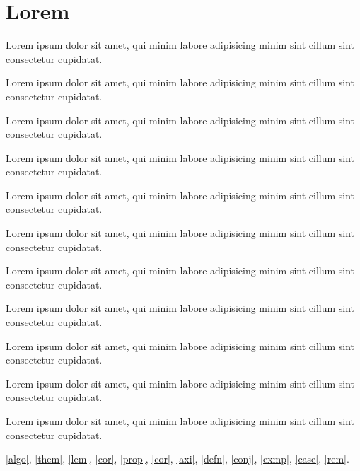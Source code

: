 \documentclass[type=master]{bithesis}
\begin{document}
\chapter{Lorem}

\begin{algo}[Lorem]
  \label{algo}
  Lorem ipsum dolor sit amet, qui minim labore adipisicing minim sint cillum sint consectetur cupidatat.
\end{algo}

\begin{them}[Lorem]
  \label{them}
  Lorem ipsum dolor sit amet, qui minim labore adipisicing minim sint cillum sint consectetur cupidatat.
\end{them}

\begin{lem}[Lorem]
  \label{lem}
  Lorem ipsum dolor sit amet, qui minim labore adipisicing minim sint cillum sint consectetur cupidatat.
\end{lem}

\begin{prop}[Lorem]
  \label{prop}
  Lorem ipsum dolor sit amet, qui minim labore adipisicing minim sint cillum sint consectetur cupidatat.
\end{prop}
\begin{cor}[Lorem]
  \label{cor}
  Lorem ipsum dolor sit amet, qui minim labore adipisicing minim sint cillum sint consectetur cupidatat.
\end{cor}
\begin{axi}[Lorem]
  \label{axi}
  Lorem ipsum dolor sit amet, qui minim labore adipisicing minim sint cillum sint consectetur cupidatat.
\end{axi}
\begin{defn}[Lorem]
  \label{defn}
  Lorem ipsum dolor sit amet, qui minim labore adipisicing minim sint cillum sint consectetur cupidatat.
\end{defn}
\begin{conj}[Lorem]
  \label{conj}
  Lorem ipsum dolor sit amet, qui minim labore adipisicing minim sint cillum sint consectetur cupidatat.
\end{conj}
\begin{exmp}[Lorem]
  \label{exmp}
  Lorem ipsum dolor sit amet, qui minim labore adipisicing minim sint cillum sint consectetur cupidatat.
\end{exmp}
\begin{case}[Lorem]
  \label{case}
  Lorem ipsum dolor sit amet, qui minim labore adipisicing minim sint cillum sint consectetur cupidatat.
\end{case}
\begin{rem}[Lorem]
  \label{rem}
  Lorem ipsum dolor sit amet, qui minim labore adipisicing minim sint cillum sint consectetur cupidatat.
\end{rem}

\autoref{algo}, \autoref{them}, \autoref{lem}, \autoref{cor}, \autoref{prop}, \autoref{cor}, \autoref{axi}, \autoref{defn}, \autoref{conj}, \autoref{exmp}, \autoref{case}, \autoref{rem}.
\end{document}

